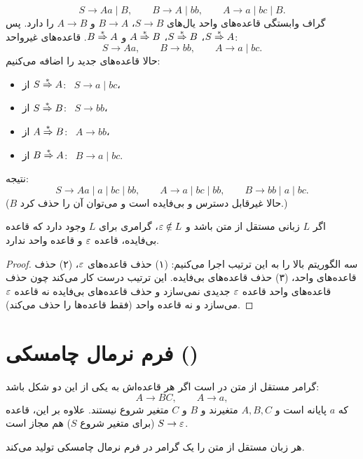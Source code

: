 \begin{example}
\[S\to Aa\mid B,\qquad B\to A\mid bb,\qquad A\to a\mid bc\mid B.\]
گراف وابستگی قاعده‌های واحد یال‌های $S\to B$، $B\to A$ و $A\to B$ را دارد. پس $S\overset{*}{\Rightarrow} A$، $S\overset{*}{\Rightarrow} B$، $A\overset{*}{\Rightarrow} B$ و $B\overset{*}{\Rightarrow} A$. قاعده‌های غیرواحد:
\[S\to Aa,\qquad B\to bb,\qquad A\to a\mid bc.\]
حالا قاعده‌های جدید را اضافه می‌کنیم:
\begin{itemize}
\item از $S\overset{*}{\Rightarrow} A$: \ $S\to a\mid bc$،
\item از $S\overset{*}{\Rightarrow} B$: \ $S\to bb$،
\item از $A\overset{*}{\Rightarrow} B$: \ $A\to bb$،
\item از $B\overset{*}{\Rightarrow} A$: \ $B\to a\mid bc$.
\end{itemize}
نتیجه:
\[S\to Aa\mid a\mid bc\mid bb,\qquad A\to a\mid bc\mid bb,\qquad B\to bb\mid a\mid bc.\]
($B$ حالا غیرقابل دسترس و بی‌فایده است و می‌توان آن را حذف کرد.)
\end{example}

\begin{theorem}
اگر $L$ زبانی مستقل از متن باشد و $\varepsilon\notin L$، گرامری برای $L$ وجود دارد که قاعده بی‌فایده، قاعده $\varepsilon$ و قاعده واحد ندارد.
\end{theorem}
\begin{proof}
سه الگوریتم بالا را به این ترتیب اجرا می‌کنیم: (۱) حذف قاعده‌های $\varepsilon$، (۲) حذف قاعده‌های واحد، (۳) حذف قاعده‌های بی‌فایده. این ترتیب درست کار می‌کند چون حذف قاعده‌های واحد قاعده $\varepsilon$ جدیدی نمی‌سازد و حذف قاعده‌های بی‌فایده نه قاعده $\varepsilon$ می‌سازد و نه قاعده واحد (فقط قاعده‌ها را حذف می‌کند).
\end{proof}

\section{فرم نرمال چامسکی ()}

\begin{definition}
گرامر مستقل از متن در  است اگر هر قاعده‌اش به یکی از این دو شکل باشد:
\[A\to BC,\qquad A\to a,\]
که $a$ پایانه است و $A,B,C$ متغیرند و $B$ و $C$ متغیر شروع نیستند. علاوه بر این، قاعده $S\to\varepsilon$ (برای متغیر شروع $S$) هم مجاز است.
\end{definition}

\begin{theorem}\label{thm:cnf}
هر زبان مستقل از متن را یک گرامر در فرم نرمال چامسکی تولید می‌کند.
\end{theorem}

